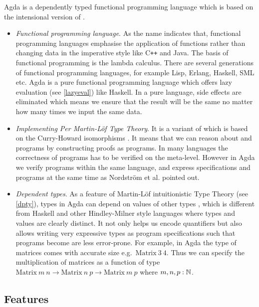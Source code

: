 Agda is a dependently typed functional programming language which is based on the intensional version
of \mltt \cite{agdawiki:main}. 

\begin{itemize}

\item \textit{Functional programming language}. As the name indicates that, functional programming languages emphasise the application of functions rather than changing data in the imperative style like C{}\verb!++! and Java. The basis of functional programming is the lambda calculus. There are several generations of functional programming languages, for example Lisp, Erlang, Haskell, SML etc. 
Agda is a pure functional programming language which offers lazy evaluation (see \ref{lazyeval}) like Haskell. In a pure language, side effects are eliminated which means we ensure that the result will be the same no matter how many times we input the same data. 

\item \textit{Implementing Per Martin-L\"{o}f Type Theory}. It is a variant of \itt which is based on the Curry-Howard isomorphisms \cite{aboa}. It means that we can reason about \maths and programs by constructing proofs as programs. In many languages the correctness of programs has to be verified on the meta-level. However in Agda we verify programs within the same language, and express specifications and  programs at the same time as Nordström et al. \cite{nor:90} pointed out.


\item \textit{Dependent types}. 
As a feature of Martin-L\"{o}f intuitionistic Type Theory (see \ref{dpty}), types in Agda can depend on values of other types \cite{dtw}, which is different from Haskell and other Hindley-Milner style languages where types and values are clearly distinct. It not only helps us encode quantifiers but also allows writing very expressive types as program specifications such that programs become are less error-prone.
For example, in Agda the type of matrices comes with accurate size e.g.\ $\text{Matrix}~3~4$. Thus we can specify the multiplication of matrices as a function of type $\text{Matrix}~m~n \to \text{Matrix}~n~p \to \text{Matrix}~m~p$ where $m,n,p : \mathbb{N}$. 
\end{itemize}


\subsection{Features}\label{features}

